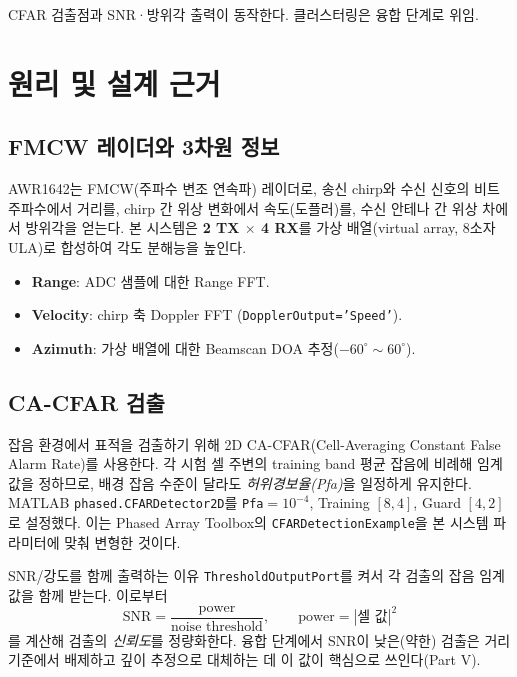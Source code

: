 \begin{statusdone}
CFAR 검출점과 SNR·방위각 출력이 동작한다. 클러스터링은 융합 단계로 위임.
\end{statusdone}

\chapter{원리 및 설계 근거}

\section{FMCW 레이더와 3차원 정보}
AWR1642는 FMCW(주파수 변조 연속파) 레이더로, 송신 chirp와 수신 신호의 비트
주파수에서 거리를, chirp 간 위상 변화에서 속도(도플러)를, 수신 안테나 간 위상
차에서 방위각을 얻는다. 본 시스템은 \textbf{2 TX $\times$ 4 RX}를 가상 배열(virtual
array, 8소자 ULA)로 합성하여 각도 분해능을 높인다.
\begin{itemize}
  \item \textbf{Range}: ADC 샘플에 대한 Range FFT.
  \item \textbf{Velocity}: chirp 축 Doppler FFT (\texttt{DopplerOutput='Speed'}).
  \item \textbf{Azimuth}: 가상 배열에 대한 Beamscan DOA 추정($-60^\circ\sim60^\circ$).
\end{itemize}

\section{CA-CFAR 검출}
잡음 환경에서 표적을 검출하기 위해 2D CA-CFAR(Cell-Averaging Constant False Alarm
Rate)를 사용한다. 각 시험 셀 주변의 training band 평균 잡음에 비례해 임계값을
정하므로, 배경 잡음 수준이 달라도 \emph{허위경보율(Pfa)}을 일정하게 유지한다.
MATLAB \texttt{phased.CFARDetector2D}를 \texttt{Pfa}$=10^{-4}$,
Training $[8,4]$, Guard $[4,2]$로 설정했다. 이는 Phased Array Toolbox의
\texttt{CFARDetectionExample}을 본 시스템 파라미터에 맞춰 변형한 것이다.

\begin{designbox}{SNR/강도를 함께 출력하는 이유}
\texttt{ThresholdOutputPort}를 켜서 각 검출의 잡음 임계값을 함께 받는다. 이로부터
\[
  \text{SNR} = \frac{\text{power}}{\text{noise threshold}},\qquad
  \text{power} = |\text{셀 값}|^2
\]
를 계산해 검출의 \emph{신뢰도}를 정량화한다. 융합 단계에서 SNR이 낮은(약한) 검출은
거리 기준에서 배제하고 깊이 추정으로 대체하는 데 이 값이 핵심으로 쓰인다(Part V).
\end{designbox}

